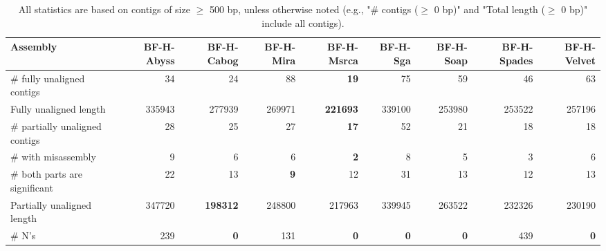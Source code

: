 \documentclass[12pt,a4paper]{article}
\begin{document}
\begin{table}[ht]
\begin{center}
\caption{All statistics are based on contigs of size $\geq$ 500 bp, unless otherwise noted (e.g., "\# contigs ($\geq$ 0 bp)" and "Total length ($\geq$ 0 bp)" include all contigs).}
\begin{tabular}{|l*{8}{|r}|}
\hline
Assembly & BF-H-Abyss & BF-H-Cabog & BF-H-Mira & BF-H-Msrca & BF-H-Sga & BF-H-Soap & BF-H-Spades & BF-H-Velvet \\ \hline
\# fully unaligned contigs & 34 & 24 & 88 & {\bf 19} & 75 & 59 & 46 & 63 \\ \hline
Fully unaligned length & 335943 & 277939 & 269971 & {\bf 221693} & 339100 & 253980 & 253522 & 257196 \\ \hline
\# partially unaligned contigs & 28 & 25 & 27 & {\bf 17} & 52 & 21 & 18 & 18 \\ \hline
\hspace{5mm}\# with misassembly & 9 & 6 & 6 & {\bf 2} & 8 & 5 & 3 & 6 \\ \hline
\hspace{5mm}\# both parts are significant & 22 & 13 & {\bf 9} & 12 & 31 & 13 & 12 & 13 \\ \hline
Partially unaligned length & 347720 & {\bf 198312} & 248800 & 217963 & 339945 & 263522 & 232326 & 230190 \\ \hline
\# N's & 239 & {\bf 0} & 131 & {\bf 0} & {\bf 0} & {\bf 0} & 439 & {\bf 0} \\ \hline
\end{tabular}
\end{center}
\end{table}
\end{document}
